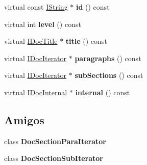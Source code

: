 \begin{DoxyCompactItemize}
\item 
\hypertarget{class_doc_section_handler_acf656d73faffcdf0382f68eb78869cf4}{virtual const \hyperlink{class_i_string}{I\-String} $\ast$ {\bfseries id} () const }\label{class_doc_section_handler_acf656d73faffcdf0382f68eb78869cf4}

\item 
\hypertarget{class_doc_section_handler_acbe435a60855d7a5389f88ee1d174de9}{virtual int {\bfseries level} () const }\label{class_doc_section_handler_acbe435a60855d7a5389f88ee1d174de9}

\item 
\hypertarget{class_doc_section_handler_ae3befd9a880aecec91df393b09c7ea86}{virtual \hyperlink{class_i_doc_title}{I\-Doc\-Title} $\ast$ {\bfseries title} () const }\label{class_doc_section_handler_ae3befd9a880aecec91df393b09c7ea86}

\item 
\hypertarget{class_doc_section_handler_ad870cd6bfbcecf45d470752b1ff5ff42}{virtual \hyperlink{class_i_doc_iterator}{I\-Doc\-Iterator} $\ast$ {\bfseries paragraphs} () const }\label{class_doc_section_handler_ad870cd6bfbcecf45d470752b1ff5ff42}

\item 
\hypertarget{class_doc_section_handler_a165e4fe99efe201a9372b5eccc78bacd}{virtual \hyperlink{class_i_doc_iterator}{I\-Doc\-Iterator} $\ast$ {\bfseries sub\-Sections} () const }\label{class_doc_section_handler_a165e4fe99efe201a9372b5eccc78bacd}

\item 
\hypertarget{class_doc_section_handler_afdba1256a0346488b335029a23b1f18b}{virtual \hyperlink{class_i_doc_internal}{I\-Doc\-Internal} $\ast$ {\bfseries internal} () const }\label{class_doc_section_handler_afdba1256a0346488b335029a23b1f18b}

\end{DoxyCompactItemize}
\subsection*{Amigos}
\begin{DoxyCompactItemize}
\item 
\hypertarget{class_doc_section_handler_a00e1b67a8135cef1d0459b44297d45d6}{class {\bfseries Doc\-Section\-Para\-Iterator}}\label{class_doc_section_handler_a00e1b67a8135cef1d0459b44297d45d6}

\item 
\hypertarget{class_doc_section_handler_ab4008c030968a91d2d5e3a0f31baddcb}{class {\bfseries Doc\-Section\-Sub\-Iterator}}\label{class_doc_section_handler_ab4008c030968a91d2d5e3a0f31baddcb}

\end{DoxyCompactItemize}
